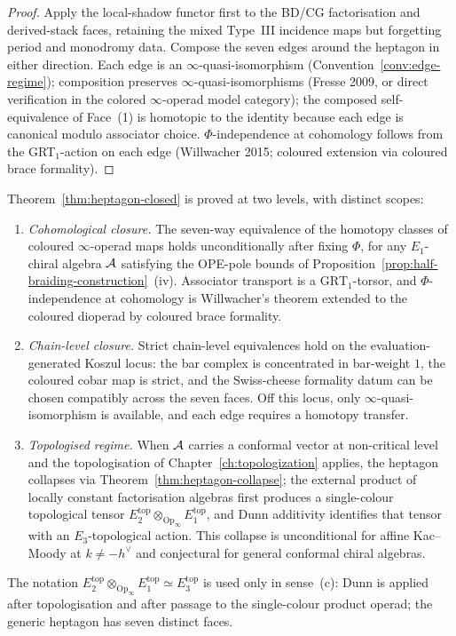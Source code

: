\begin{proof}
Apply the local-shadow functor first to the BD/CG factorisation and
derived-stack faces, retaining the mixed Type~III incidence maps but
forgetting period and monodromy data. Compose the seven edges around
the heptagon in either direction.
Each edge is an $\infty$-quasi-isomorphism
(Convention~\ref{conv:edge-regime}); composition preserves
$\infty$-quasi-isomorphisms (Fresse 2009, or direct verification in
the colored $\infty$-operad model category); the composed
self-equivalence of Face~(1) is homotopic to the identity because
each edge is canonical modulo associator choice. $\Phi$-independence
at cohomology follows from the GRT$_1$-action on each edge
(Willwacher 2015; coloured extension via coloured brace
formality).
\end{proof}

\begin{remark}
\label{rem:heptagon-chain-vs-cohom}
Theorem~\ref{thm:heptagon-closed} is proved at two levels, with
distinct scopes:
\begin{enumerate}[label=\textup{(\alph*)}]
 \item \emph{Cohomological closure.} The seven-way equivalence of
 the homotopy classes of coloured $\infty$-operad maps holds
 unconditionally after fixing $\Phi$, for any $E_1$-chiral algebra
 $\mathcal{A}$ satisfying the OPE-pole bounds of
 Proposition~\ref{prop:half-braiding-construction}~(iv).
 Associator transport is a $\mathrm{GRT}_1$-torsor, and
 $\Phi$-independence at cohomology is Willwacher's theorem
 extended to the coloured dioperad by coloured brace formality.
 \item \emph{Chain-level closure.} Strict chain-level equivalences
 hold on the evaluation-generated Koszul locus: the bar complex is
 concentrated in bar-weight $1$, the coloured cobar map is strict,
 and the Swiss-cheese formality datum can be chosen compatibly
 across the seven faces. Off this locus, only
 $\infty$-quasi-isomorphism is available, and each edge requires
 a homotopy transfer.
 \item \emph{Topologised regime.} When $\mathcal{A}$ carries a conformal
 vector at non-critical level and the topologisation of
 Chapter~\ref{ch:topologization} applies, the heptagon collapses
 via Theorem~\ref{thm:heptagon-collapse}; the external product of
 locally constant factorisation algebras first produces a
 single-colour topological tensor
 $E_2^{\mathrm{top}}\otimes_{\mathrm{Op}_\infty}E_1^{\mathrm{top}}$,
 and Dunn additivity identifies that tensor with an
 $E_3$-topological action. This collapse is
 unconditional for affine Kac--Moody at $k\neq -h^\vee$ and
 conjectural for general conformal chiral algebras.
\end{enumerate}
The notation
$E_2^{\mathrm{top}}\otimes_{\mathrm{Op}_\infty}E_1^{\mathrm{top}}
\simeq E_3^{\mathrm{top}}$ is used only in sense~(c): Dunn is applied
after topologisation and after passage to the single-colour product
operad; the generic heptagon has seven distinct faces.
\end{remark}


